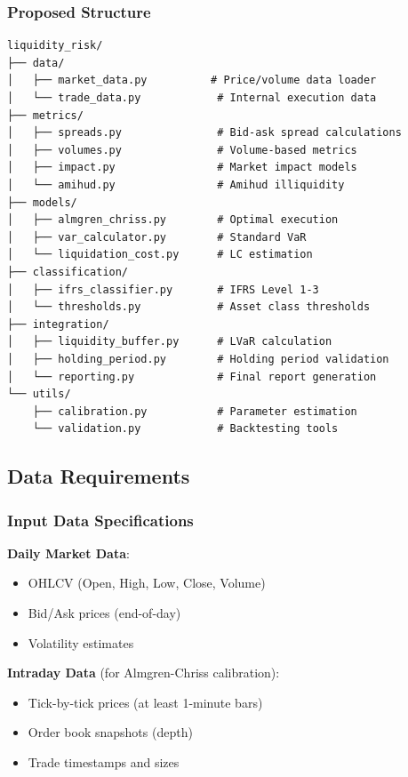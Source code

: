 \documentclass[11pt,a4paper]{article}
\begin{document}
\subsubsection{Proposed Structure}

\begin{verbatim}
liquidity_risk/
├── data/
│   ├── market_data.py          # Price/volume data loader
│   └── trade_data.py            # Internal execution data
├── metrics/
│   ├── spreads.py               # Bid-ask spread calculations
│   ├── volumes.py               # Volume-based metrics
│   ├── impact.py                # Market impact models
│   └── amihud.py                # Amihud illiquidity
├── models/
│   ├── almgren_chriss.py        # Optimal execution
│   ├── var_calculator.py        # Standard VaR
│   └── liquidation_cost.py      # LC estimation
├── classification/
│   ├── ifrs_classifier.py       # IFRS Level 1-3
│   └── thresholds.py            # Asset class thresholds
├── integration/
│   ├── liquidity_buffer.py      # LVaR calculation
│   ├── holding_period.py        # Holding period validation
│   └── reporting.py             # Final report generation
└── utils/
    ├── calibration.py           # Parameter estimation
    └── validation.py            # Backtesting tools
\end{verbatim}

\subsection{Data Requirements}

\subsubsection{Input Data Specifications}

\textbf{Daily Market Data}:
\begin{itemize}
    \item OHLCV (Open, High, Low, Close, Volume)
    \item Bid/Ask prices (end-of-day)
    \item Volatility estimates
\end{itemize}

\textbf{Intraday Data} (for Almgren-Chriss calibration):
\begin{itemize}
    \item Tick-by-tick prices (at least 1-minute bars)
    \item Order book snapshots (depth)
    \item Trade timestamps and sizes
\end{itemize}
\end{document}
